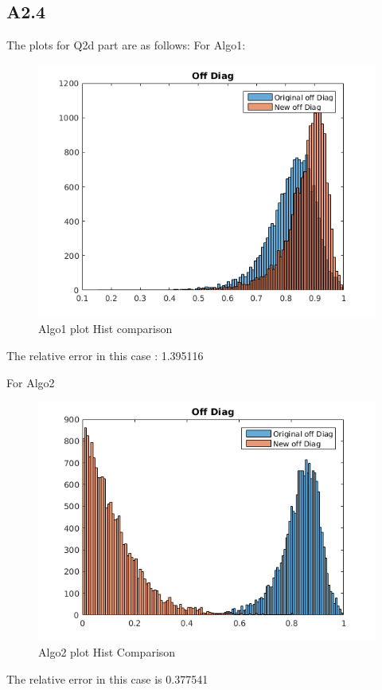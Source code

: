 \documentclass{article}
\begin{document}
\subsection*{A2.4}
The plots for Q2d part are as follows:
For Algo1:
\begin{figure}[H]
  \centering
  \includegraphics[scale=0.5]{images/q2d_actual_algo}
  \caption{Algo1 plot Hist comparison}
  \label{fig:6}
\end{figure}
The relative error in this case : 1.395116

For Algo2
\begin{figure}[H]
  \centering
  \includegraphics[scale=0.5]{images/q2d_lam_inv}
  \caption{Algo2 plot Hist Comparison}
  \label{fig:7}
\end{figure}
The relative error in this case is 0.377541
\end{document}
